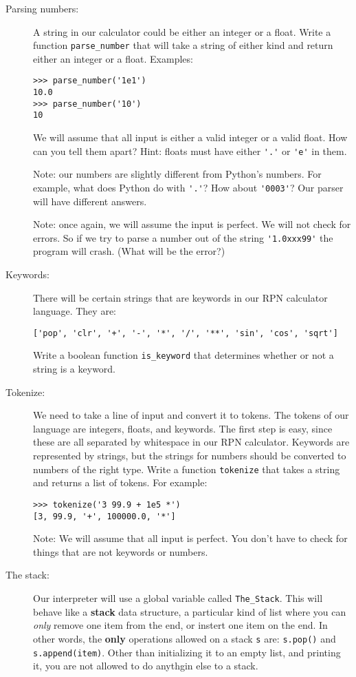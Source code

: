 \documentclass[12pt]{article}
\begin{document}
\begin{description}
\item[Parsing numbers:] A string in our calculator could be
either an integer or a float.  Write a function \lstinline{parse_number}
that will take a string of either kind and return either
an integer or a float.  Examples:
\begin{lstlisting}
>>> parse_number('1e1')
10.0
>>> parse_number('10')
10
\end{lstlisting}
We will assume that all input is either a valid integer or a
valid float.  How can you tell them apart?  Hint:
floats must have either \lstinline{'.'} or \lstinline{'e'}
in them.

Note: our numbers are slightly different from Python's numbers.
For example, what does Python do with \lstinline{'.'}?
How about \lstinline{'0003'}?  Our parser will have different
answers.

Note:  once again, we will assume the input is perfect.
We will not check for errors.  So if we try to parse
a number out of the string \lstinline{'1.0xxx99'}
the program will crash.  (What will be the error?)

\item[Keywords:] There will be certain strings that
are keywords in our RPN calculator language.  They are:
\begin{lstlisting}
['pop', 'clr', '+', '-', '*', '/', '**', 'sin', 'cos', 'sqrt']
\end{lstlisting}

Write a boolean function \lstinline{is_keyword}  that determines
whether or not a string is a keyword.

\item[Tokenize:] We need to take a line of input and
convert it to tokens.  The tokens of our language are
integers, floats, and keywords.  The first step is easy, since
these are all separated by whitespace in our RPN calculator.
Keywords are represented
by strings, but the strings for numbers should be converted
to numbers of the right type.
Write a function \lstinline{tokenize} that takes a string
and returns a list of tokens.  For example:
\begin{lstlisting}
>>> tokenize('3 99.9 + 1e5 *')
[3, 99.9, '+', 100000.0, '*']
\end{lstlisting}

Note: We will assume that all input is perfect.  You
don't have to check for things that are not 
keywords or numbers.

\item[The stack:]  Our interpreter will use a global variable
called \lstinline{The_Stack}.  This will behave like a {\bf stack}
data structure,
a particular kind of list where you can {\em only}
remove one item from the end, or instert one item
on the end.  In other words, the {\bf only} operations
allowed on a stack \lstinline{s} are:
\lstinline{s.pop()} and \lstinline{s.append(item)}.
Other than initializing it to an empty list, and printing it,
you are not allowed to do anythgin else to a stack.


\end{description}
\end{document}
